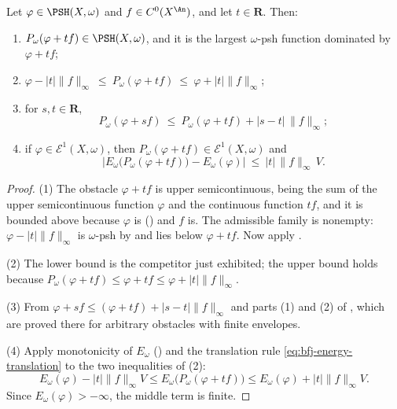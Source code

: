 \begin{lemma}
\label{lem:ch27-e1-envelope-calculus}
Let $\varphi\in\PSH(X,\omega)$ and $f\in C^0(X^{\An})$, and let
$t\in\mathbf R$.  Then:
\begin{enumerate}
\item $P_\omega(\varphi+tf)\in\PSH(X,\omega)$, and it is the largest
$\omega$-psh function dominated by $\varphi+tf$;
\item $\varphi-|t|\lVert f\rVert_\infty\ \leq\ P_\omega(\varphi+tf)
\ \leq\ \varphi+|t|\lVert f\rVert_\infty$;
\item for $s,t\in\mathbf R$,
\begin{equation}\label{eq:ch27-e1-contraction}
 P_\omega(\varphi+sf)\ \leq\ P_\omega(\varphi+tf)
   +|s-t|\,\lVert f\rVert_\infty ;
\end{equation}
\item if $\varphi\in\mathcal E^1(X,\omega)$, then
$P_\omega(\varphi+tf)\in\mathcal E^1(X,\omega)$ and
\begin{equation}\label{eq:ch27-e1-energy-lipschitz}
 \bigl|E_\omega\bigl(P_\omega(\varphi+tf)\bigr)-E_\omega(\varphi)\bigr|
 \ \leq\ |t|\,\lVert f\rVert_\infty\,V .
\end{equation}
\end{enumerate}
\end{lemma}

\begin{proof}
(1) The obstacle $\varphi+tf$ is upper semicontinuous, being the sum of the
upper semicontinuous function $\varphi$ and the continuous function
$tf$, and it is bounded above because $\varphi$ is
() and $f$ is.  The admissible family is nonempty:
$\varphi-|t|\lVert f\rVert_\infty$ is $\omega$-psh by
 and lies below $\varphi+tf$.  Now
apply .

(2) The lower bound is the competitor just exhibited; the upper bound holds
because $P_\omega(\varphi+tf)\leq\varphi+tf\leq\varphi+|t|\lVert
f\rVert_\infty$.

(3) From $\varphi+sf\leq(\varphi+tf)+|s-t|\lVert f\rVert_\infty$ and parts
(1) and (2) of , which are proved
there for arbitrary obstacles with finite envelopes.

(4) Apply monotonicity of $E_\omega$ () and
the translation rule \eqref{eq:bfj-energy-translation} to the two
inequalities of (2):
\[
 E_\omega(\varphi)-|t|\lVert f\rVert_\infty V
 \leq E_\omega\bigl(P_\omega(\varphi+tf)\bigr)
 \leq E_\omega(\varphi)+|t|\lVert f\rVert_\infty V .
\]
Since $E_\omega(\varphi)>-\infty$, the middle term is finite.
\end{proof}

